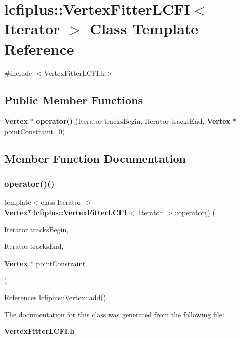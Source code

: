 \section{lcfiplus\+:\+:Vertex\+Fitter\+L\+C\+FI$<$ Iterator $>$ Class Template Reference}
\label{classlcfiplus_1_1VertexFitterLCFI}


{\ttfamily \#include $<$Vertex\+Fitter\+L\+C\+F\+I.\+h$>$}

\subsection*{Public Member Functions}
\begin{DoxyCompactItemize}
\item 
\textbf{ Vertex} $\ast$ \textbf{ operator()} (Iterator tracks\+Begin, Iterator tracks\+End, \textbf{ Vertex} $\ast$point\+Constraint=0)
\end{DoxyCompactItemize}


\subsection{Member Function Documentation}
\mbox{\label{classlcfiplus_1_1VertexFitterLCFI_a773aed75e90764e198e476f8e70f85c8}} 
\subsubsection{operator()()}
{\footnotesize\ttfamily template$<$class Iterator $>$ \\
\textbf{ Vertex}$\ast$ \textbf{ lcfiplus\+::\+Vertex\+Fitter\+L\+C\+FI}$<$ Iterator $>$\+::operator() (\begin{DoxyParamCaption}\item[{Iterator}]{tracks\+Begin,  }\item[{Iterator}]{tracks\+End,  }\item[{\textbf{ Vertex} $\ast$}]{point\+Constraint = {} }\end{DoxyParamCaption})\hspace{0.3cm}{\ttfamily [inline]}}



References lcfiplus\+::\+Vertex\+::add().



The documentation for this class was generated from the following file\+:\begin{DoxyCompactItemize}
\item 
\textbf{ Vertex\+Fitter\+L\+C\+F\+I.\+h}\end{DoxyCompactItemize}
